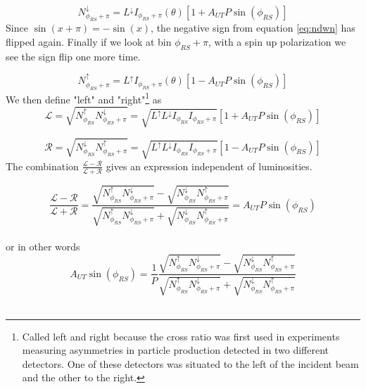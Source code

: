 \documentclass[abstract = on,listof=totoc, bibliography=totoc]{scrreprt}
\newcommand{\phirs}{\phi_{RS}}
\begin{document}
\begin{equation}
N^\downarrow_{\phi_{RS}+\pi} = L^\downarrow I_{\phi_{RS}+\pi}(\theta)\left[1+A_{UT}P\sin(\phi_{RS})\right]
\end{equation}
%
Since $\sin(x+\pi) = -\sin(x)$, the negative sign from equation \ref{eq:ndwn} has flipped again. Finally if we look at bin $\phi_{RS} + \pi$, with a spin up polarization we see the sign flip one more time. 

\begin{equation}
N^\uparrow_{\phi_{RS}+\pi} = L^\uparrow I_{\phi_{RS}+\pi}(\theta)\left[1-A_{UT}P\sin(\phi_{RS})\right]
\end{equation}
%
We then define "left" and "right"\footnote{Called left and right because the cross ratio was first used in experiments measuring asymmetries in particle production detected in two different detectors. One of these detectors was situated to the left of the incident beam and the other to the right.} as 
\begin{equation}
\mathcal{L} = \sqrt{N^\uparrow_{\phi_{RS}}N^\downarrow_{\phi_{RS}+\pi}}  = \sqrt{L^\uparrow L^\downarrow I_{\phi_{RS}} I_{\phi_{RS}+\pi}} \left[ 1+A_{UT}P\sin(\phi_{RS})\right]
\end{equation}

\begin{equation}
\mathcal{R} = \sqrt{N^\downarrow_{\phi_{RS}}N^\uparrow_{\phi_{RS}+\pi}} = \sqrt{L^\uparrow L^\downarrow I_{\phi_{RS}} I_{\phi_{RS}+\pi}} \left[ 1-A_{UT}P\sin(\phi_{RS})\right]
\end{equation}
%
The combination $\frac{\mathcal{L} - \mathcal{R}}{\mathcal{L} + \mathcal{R}}$  gives an expression independent of luminosities. 

\begin{equation}
\label{eq:crossRatio}
\frac{\mathcal{L} - \mathcal{R}}{\mathcal{L} +\mathcal{R}} = \frac{\sqrt{N^\uparrow_{\phi_{RS}}N^\downarrow_{\phi_{RS}+\pi}} - \sqrt{N^\downarrow_{\phi_{RS}}N^\uparrow_{\phi_{RS}+\pi}}}{\sqrt{N^\uparrow_{\phi_{RS}}N^\downarrow_{\phi_{RS}+\pi}} + \sqrt{N^\downarrow_{\phi_{RS}}N^\uparrow_{\phi_{RS}+\pi}}} = A_{UT}P\sin(\phi_{RS})
\end{equation}\\
%
or in other words
\begin{equation}
\label{eq:crossRatio2}
A_{UT}\sin\left(\phirs\right) = \frac{1}{P}\frac{\sqrt{N^\uparrow_{\phi_{RS}}N^\downarrow_{\phi_{RS}+\pi}} - \sqrt{N^\downarrow_{\phi_{RS}}N^\uparrow_{\phi_{RS}+\pi}}}{\sqrt{N^\uparrow_{\phi_{RS}}N^\downarrow_{\phi_{RS}+\pi}} + \sqrt{N^\downarrow_{\phi_{RS}}N^\uparrow_{\phi_{RS}+\pi}}}
\end{equation}\\
\end{document}
